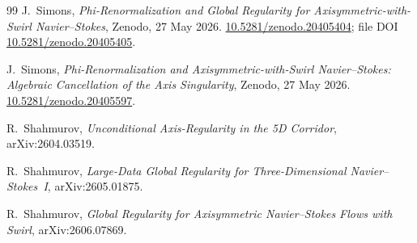 \documentclass[11pt]{article}
\theoremstyle{definition}
\begin{document}
\begin{thebibliography}{99}
J.~Simons,
\textit{Phi-Renormalization and Global Regularity for Axisymmetric-with-Swirl Navier--Stokes},
Zenodo, 27 May 2026.
\href{https://doi.org/10.5281/zenodo.20405404}{10.5281/zenodo.20405404};
file DOI
\href{https://doi.org/10.5281/zenodo.20405405}{10.5281/zenodo.20405405}.

J.~Simons,
\textit{Phi-Renormalization and Axisymmetric-with-Swirl Navier--Stokes:
Algebraic Cancellation of the Axis Singularity},
Zenodo, 27 May 2026.
\href{https://doi.org/10.5281/zenodo.20405597}{10.5281/zenodo.20405597}.

R.~Shahmurov,
\textit{Unconditional Axis-Regularity in the 5D Corridor},
arXiv:2604.03519.

R.~Shahmurov,
\textit{Large-Data Global Regularity for Three-Dimensional Navier--Stokes~I},
arXiv:2605.01875.

R.~Shahmurov,
\textit{Global Regularity for Axisymmetric Navier--Stokes Flows with Swirl},
arXiv:2606.07869.

\end{thebibliography}
\end{document}
